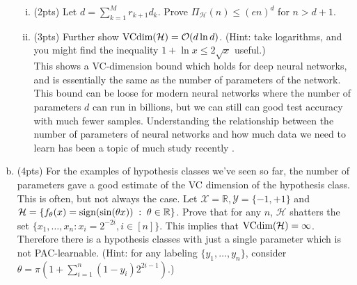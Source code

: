\documentclass[11pt]{article}
\newcommand{\calX}{{\mathcal{X}}}
\newcommand{\calY}{{\mathcal{Y}}}
\newcommand{\calH}{{\mathcal{H}}}
\newcommand{\VC}{{\text{\rm VCdim}}}
\newcommand{\blue}[1]{{\color{blue}#1}}
\newcommand{\R}{\mathbb{R}}
\newcommand{\cbr}[1]{\left\{#1\right\}}
\newcommand{\order}{\ensuremath{\mathcal{O}}}
\newcommand{\sign}{{\text{\rm sign}}}
\begin{document}
\begin{enumerate}[(a)]
\begin{enumerate}[(i)]
\item (\blue{2pts}) 
Let $d = \sum_{k=1}^M r_{k+1} d_k$. Prove $\Pi_\calH(n) \leq (en)^d$ for $n>d+1$. \\

\item (\blue{3pts}) 
Further show $\VC(\calH) = \order(d\ln d)$.
(Hint: take logarithms, and you might find the inequality $1+\ln x \leq 2\sqrt{x}$ useful.)\\

This shows a VC-dimension bound which holds for deep neural networks, and is essentially the same as the number of parameters of the network. This bound can be  loose for modern neural networks where the number of parameters $d$ can run in billions, but we can still can good test accuracy with much fewer samples. Understanding the relationship between the number of parameters of neural networks and how much data we need to learn has been a topic of much study recently \cite{kaplan2020scaling,hoffmann2022training}.

\end{enumerate}

\vspace{5pt}
\item (\blue{4pts}) 
For the examples of hypothesis classes we've seen so far, the number of parameters gave a good estimate of the VC dimension of the hypothesis class. This is often, but not always the case. Let $\calX = \R, \calY = \{-1,+1\}$ and $\calH = \cbr{f_\theta(x) = \sign(\sin(\theta x)) \;:\; \theta \in \R}$.
Prove that for any $n$, $\calH$ shatters the set $\{x_1,\dots,x_n: x_i = 2^{-2i}, i \in [n]\}$. This implies that $\VC(\calH) = \infty$. Therefore there is a hypothesis classes with just a single parameter which is not PAC-learnable.
(Hint: for any labeling $\{y_1,\dots, y_n\}$, consider $\theta = \pi(1+ \sum_{i=1}^n (1-y_i)2^{2i-1})$.)  \\

\end{enumerate}




\end{document}
